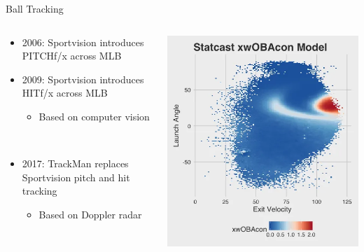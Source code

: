 \documentclass[handout]{beamer}
\begin{document}
\begin{frame}{Ball Tracking}
  \begin{columns}
    \begin{column}{0.6\textwidth}
      \begin{itemize}
        \item 2006: Sportvision introduces PITCHf/x across MLB
        \item 2009: Sportvision introduces HITf/x across MLB
        \begin{itemize}
          \item Based on computer vision
        \end{itemize}
        ~\\
        \item 2017: TrackMan replaces Sportvision pitch and hit tracking
        \begin{itemize}
          \item Based on Doppler radar
        \end{itemize}
      \end{itemize}
    \end{column}
    \pause
    \begin{column}{0.4\textwidth}
      \includegraphics[width = \textwidth]{images/xwobacon.png}
    \end{column}
  \end{columns}
\end{frame}
\end{document}
